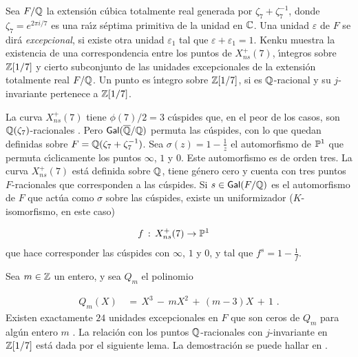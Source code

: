 

Sea $F/\mathbb{Q}$ la extensi\'{o}n c\'{u}bica totalmente real generada por
$\zeta_{7}+\zeta_{7}^{-1}$, donde $\zeta_{7}=e^{2\pi i/7}$ es una ra\'{\i}z
s\'{e}ptima primitiva de la unidad en $\mathbb{C}$. Una unidad $\varepsilon$ de
$F$ se dir\'{a} \emph{excepcional}, si existe otra unidad $\varepsilon_{1}$
tal que $\varepsilon+\varepsilon_{1}=1$. Kenku \cite{kenkuLevelSeven}
muestra la existencia de una correspondencia entre los puntos de $X_{ns}^{+}(7)$,
\'{\i}ntegros sobre $\mathbb{Z}[1/7]$ y cierto subconjunto de las unidades
excepcionales de la extensi\'{o}n totalmente real $F/\mathbb{Q}$. Un punto es
\'{\i}ntegro sobre $\mathbb{Z}[1/7]$, si es $\mathbb{Q}$-racional y su
$j$-invariante
pertenece a $\mathbb{Z}[1/7]$.

La curva $X_{ns}^{+}(7)$ tiene $\phi(7)/2=3$ c\'{u}spides que, en el peor de
los casos, son $\mathbb{Q}(\zeta_{7})$-racionales%
. Pero $\mathsf{Gal}(\overline{\mathbb{Q}}/\mathbb{Q})$ permuta las c\'{u}spides, con lo que quedan
definidas sobre $F=\mathbb{Q}(\zeta_{7}+\zeta_{7}^{-1})$.
Sea $\sigma(z)=1-\frac{1}{z}$ el automorfismo de $\mathbb{P}^{1}$ que permuta
c\'{\i}clicamente los puntos $\infty$, $1$ y $0$. Este automorfismo es de
orden tres. La curva $X_{ns}^{+}(7)$ est\'{a} definida sobre $\mathbb{Q}$,
tiene g\'{e}nero cero y cuenta con tres puntos $F$-racionales que
corresponden a las c\'{u}spides. Si $s\in\mathsf{Gal}(F/\mathbb{Q})$ es el automorfismo
de $F$ que act\'{u}a como $\sigma$ sobre las c\'{u}spides, existe un
uniformizador ($K$-isomorfismo, en este caso)

\begin{align*}
 f & \,:\,X_{ns}^{+}(7)\rightarrow\mathbb{P}^{1}
\end{align*}
que hace corresponder las c\'{u}spides con $\infty$, $1$ y $0$, y tal que
$f^{s}=1-\frac{1}{f}$.

Sea $m\in\mathbb{Z}$ un entero, y sea $Q_{m}$ el polinomio

\begin{align*}
Q_{m}(X) & \,=\,X^{3}\,-\,mX^{2}\,+\,(m-3)X\,+\,1
\text{ .}
\end{align*}
Existen exactamente $24$ unidades excepcionales en $F$ que son ceros de
$Q_{m}$ para alg\'{u}n entero $m$%
. La relaci\'{o}n con los puntos $\mathbb{Q}$-racionales con $j$-invariante
en $\mathbb{Z}[1/7]$ est\'{a} dada por el siguiente lema. La demostraci\'{o}n
se puede hallar en \cite{kenkuLevelSeven}.


